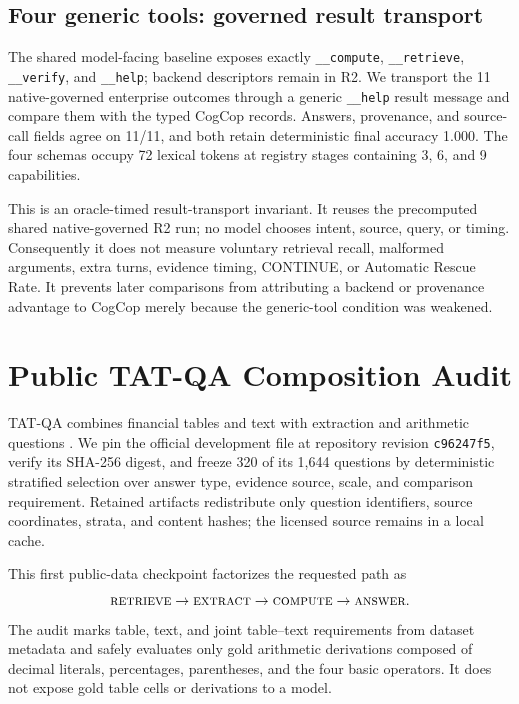 \documentclass[11pt]{article}
\begin{document}
\subsection{Four generic tools: governed result transport}
The shared model-facing baseline exposes exactly \texttt{\_\_compute},
\texttt{\_\_retrieve}, \texttt{\_\_verify}, and \texttt{\_\_help}; backend
descriptors remain in R2. We transport the 11 native-governed enterprise
outcomes through a generic \texttt{\_\_help} result message and compare them
with the typed CogCop records. Answers, provenance, and source-call fields agree
on 11/11, and both retain deterministic final accuracy 1.000. The four schemas
occupy 72 lexical tokens at registry stages containing 3, 6, and 9 capabilities.

This is an oracle-timed result-transport invariant. It reuses the precomputed
shared native-governed R2 run; no model chooses intent, source, query, or timing.
Consequently it does not measure voluntary retrieval recall, malformed
arguments, extra turns, evidence timing, CONTINUE, or Automatic Rescue Rate.
It prevents later comparisons from attributing a backend or provenance
advantage to CogCop merely because the generic-tool condition was weakened.

\section{Public TAT-QA Composition Audit}
TAT-QA combines financial tables and text with extraction and arithmetic
questions \cite{tatqa}. We pin the official development file at repository
revision \texttt{c96247f5}, verify its SHA-256 digest, and freeze 320 of its
1,644 questions by deterministic stratified selection over answer type, evidence
source, scale, and comparison requirement. Retained artifacts redistribute only
question identifiers, source coordinates, strata, and content hashes; the
licensed source remains in a local cache.

This first public-data checkpoint factorizes the requested path as
\[
\textsc{retrieve}\rightarrow\textsc{extract}\rightarrow
\textsc{compute}\rightarrow\textsc{answer}.
\]
The audit marks table, text, and joint table--text requirements from dataset
metadata and safely evaluates only gold arithmetic derivations composed of
decimal literals, percentages, parentheses, and the four basic operators. It
does not expose gold table cells or derivations to a model.
\end{document}
